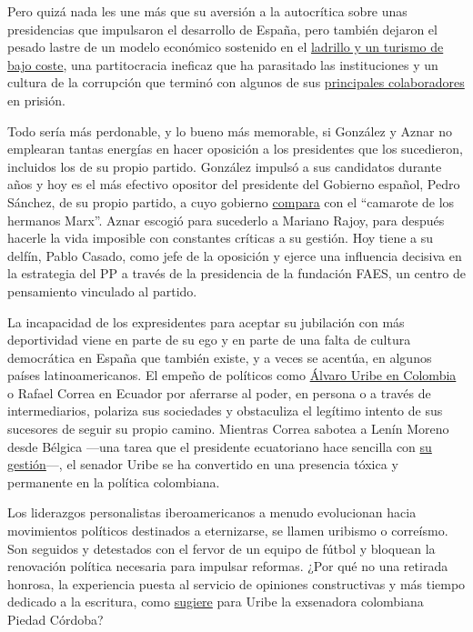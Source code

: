 Pero quizá nada les une más que su aversión a la autocrítica sobre unas
presidencias que impulsaron el desarrollo de España, pero también
dejaron el pesado lastre de un modelo económico sostenido en el
\href{https://www.nytimes3xbfgragh.onion/es/2019/08/05/espanol/opinion/turismo-espana.html}{ladrillo
y un turismo de bajo coste}, una partitocracia ineficaz que ha
parasitado las instituciones y un cultura de la corrupción que terminó
con algunos de sus
\href{https://www.eldiario.es/politica/sumarios-ministros-aznar-llegaron-corrupcion_1_2108010.html}{principales
colaboradores} en prisión.

Todo sería más perdonable, y lo bueno más memorable, si González y Aznar
no emplearan tantas energías en hacer oposición a los presidentes que
los sucedieron, incluidos los de su propio partido. González impulsó a
sus candidatos durante años y hoy es el más efectivo opositor del
presidente del Gobierno español, Pedro Sánchez, de su propio partido, a
cuyo gobierno
\href{https://www.elindependiente.com/politica/2020/06/11/felipe-gonzalez-compara-el-gobierno-con-el-camarote-de-los-hermanos-marx/}{compara}
con el ``camarote de los hermanos Marx''. Aznar escogió para sucederlo a
Mariano Rajoy, para después hacerle la vida imposible con constantes
críticas a su gestión. Hoy tiene a su delfín, Pablo Casado, como jefe de
la oposición y ejerce una influencia decisiva en la estrategia del PP a
través de la presidencia de la fundación FAES, un centro de pensamiento
vinculado al partido.

La incapacidad de los expresidentes para aceptar su jubilación con más
deportividad viene en parte de su ego y en parte de una falta de cultura
democrática en España que también existe, y a veces se acentúa, en
algunos países latinoamericanos. El empeño de políticos como
\href{https://www.nytimes3xbfgragh.onion/es/2018/06/07/espanol/opinion/opinion-colombo-alvaro-uribe-colombia-duque.html}{Álvaro
Uribe en Colombia} o Rafael Correa en Ecuador por aferrarse al poder, en
persona o a través de intermediarios, polariza sus sociedades y
obstaculiza el legítimo intento de sus sucesores de seguir su propio
camino. Mientras Correa sabotea a Lenín Moreno desde Bélgica ---una
tarea que el presidente ecuatoriano hace sencilla con
\href{https://www.nytimes3xbfgragh.onion/es/2020/07/08/espanol/opinion/ecuador-lenin-moreno.html}{su
gestión}---, el senador Uribe se ha convertido en una presencia tóxica y
permanente en la política colombiana.

Los liderazgos personalistas iberoamericanos a menudo evolucionan hacia
movimientos políticos destinados a eternizarse, se llamen uribismo o
correísmo. Son seguidos y detestados con el fervor de un equipo de
fútbol y bloquean la renovación política necesaria para impulsar
reformas. ¿Por qué no una retirada honrosa, la experiencia puesta al
servicio de opiniones constructivas y más tiempo dedicado a la
escritura, como
\href{https://www.semana.com/semana-tv/vicky-en-semana/articulo/piedad-cordoba-explico-por-que-uribe-y-petro-se-deben-retirar--colombia-hoy/687160}{sugiere}
para Uribe la exsenadora colombiana Piedad Córdoba?

